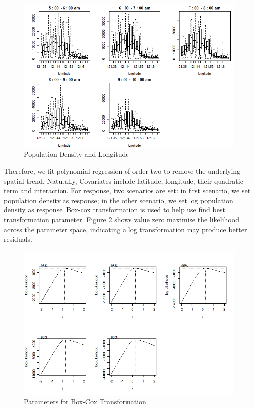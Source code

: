 \documentclass[hidelinks,12pt]{article}
\begin{document}
\begin{figure}[!ht]
		\includegraphics[width=\textwidth]{long.png}
		\caption{Population Density and Longitude\label{fig:long}}
\end{figure}
\FloatBarrier

Therefore, we fit polynomial regression of order two to remove the underlying spatial trend. Naturally, Covariates include latitude, longitude, their quadratic term and interaction. For response, two scenarios are set: in first scenario, we set population density as response; in the other scenario, we set log population density as response. Box-cox transformation is used to help use find best transformation parameter. Figure \ref{fig:boxcox} shows value zero maximize the likelihood across the parameter space, indicating a log transformation may produce better residuals. 
\begin{figure}[!ht]
		\includegraphics[width=\textwidth]{boxcox.png}
		\caption{Parameters for Box-Cox Transformation\label{fig:boxcox}}
\end{figure}
\FloatBarrier
\end{document}
